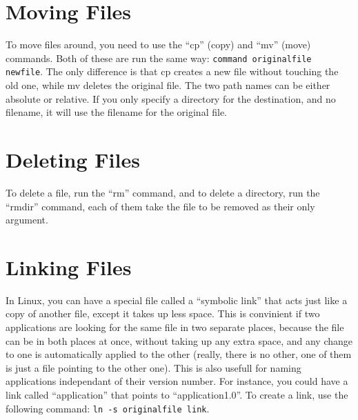 \documentclass[12pt,letterpaper,oneside, openany]{book} \usepackage[latin1] {inputenc}
\begin{document}
\section{Moving Files}

To move files around, you need to use the ``cp'' (copy) and ``mv'' (move) commands.  Both of these are run the same way: \verb+command originalfile newfile+.  The only difference is that cp creates a new file without touching the old one, while mv deletes the original file.  The two path names can be either absolute or relative.  If you only specify a directory for the destination, and no filename, it will use the filename for the original file.

\section{Deleting Files}

To delete a file, run the ``rm'' command, and to delete a directory, run the ``rmdir'' command, each of them take the file to be removed as their only argument.

\section{Linking Files}

In Linux, you can have a special file called a ``symbolic link'' that acts just like a copy of another file, except it takes up less space.  This is convinient if two applications are looking for the same file in two separate places, because the file can be in both places at once, without taking up any extra space, and any change to one is automatically applied to the other (really, there is no other, one of them is just a file pointing to the other one).  This is also usefull for naming applications independant of their version number.  For instance, you could have a link called ``application'' that points to ``application1.0''.  To create a link, use the following command: \verb+ln -s originalfile link+.
\end{document}

